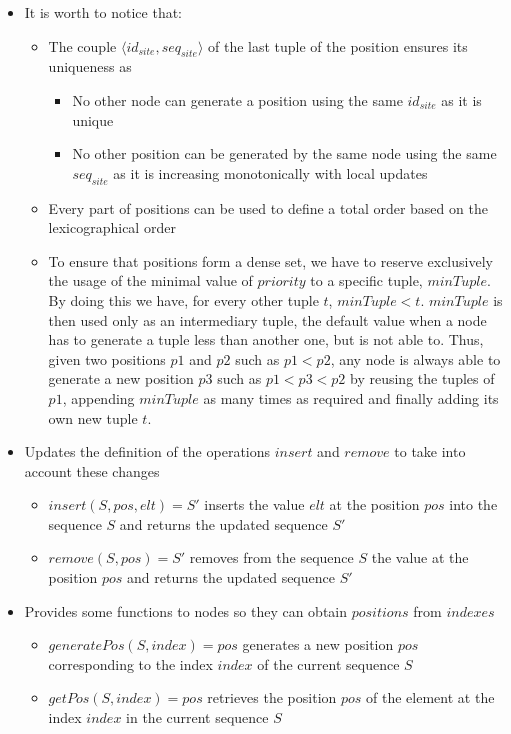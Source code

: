 \documentclass{article}
\newcommand{\tuple}[1]{\langle #1 \rangle}
\newcounter{definition-counter}
\theoremstyle{definition}
\begin{document}
\begin{itemize}
    \item It is worth to notice that: 
    \begin{itemize}
        \item The couple $\tuple{id_{site}, seq_{site}}$ of the last tuple of the position ensures its uniqueness as
        \begin{itemize}
            \item No other node can generate a position using the same $id_{site}$ as it is unique
            \item No other position can be generated by the same node using the same $seq_{site}$ as it is increasing monotonically with local updates
        \end{itemize}
        \item Every part of positions can be used to define a total order based on the lexicographical order
        \item To ensure that positions form a dense set, we have to reserve exclusively the usage of the minimal value of $priority$ to a specific tuple, $minTuple$. By doing this we have, for every other tuple $t$, $minTuple < t$. $minTuple$ is then used only as an intermediary tuple, the default value when a node has to generate a tuple less than another one, but is not able to. Thus, given two positions $p1$ and $p2$ such as $p1 < p2$, any node is always able to generate a new position $p3$ such as $p1 < p3 < p2$ by reusing the tuples of $p1$, appending $minTuple$ as many times as required and finally adding its own new tuple $t$.
    \end{itemize}
    \item Updates the definition of the operations $insert$ and $remove$ to take into account these changes
    \begin{itemize}
        \item $insert(S, pos, elt) = S'$ inserts the value $elt$ at the position $pos$ into the sequence $S$ and returns the updated sequence $S'$
        \item $remove(S, pos) = S'$ removes from the sequence $S$ the value at the position $pos$ and returns the updated sequence $S'$
    \end{itemize}
    \item Provides some functions to nodes so they can obtain $positions$ from $indexes$
    \begin{itemize}
        \item $generatePos(S, index) = pos$ generates a new position $pos$ corresponding to the index $index$ of the current sequence $S$
        \item $getPos(S, index) = pos$ retrieves the position $pos$ of the element at the index $index$ in the current sequence $S$
    \end{itemize}
\end{itemize}
\end{document}
